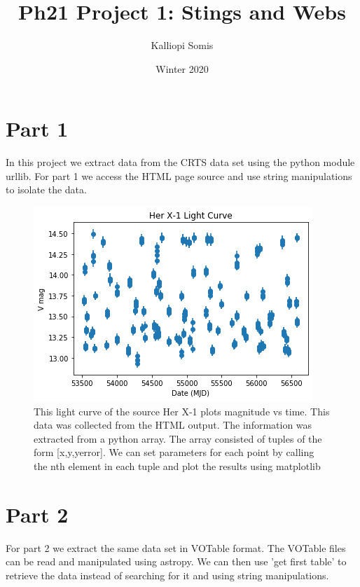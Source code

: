 \documentclass{article}
\title{Ph21 Project 1: Stings and Webs}
\author{Kalliopi Somis }
\date{Winter 2020}
\begin{document}
\maketitle

\section{Part 1}
In this project we extract data from the CRTS data set using the python module urllib. For  part 1 we access the HTML page source and use string manipulations to isolate the data. 

\begin{figure}[ht!]
\centering
\includegraphics[scale=.7]{lc1.png}
\caption{This light curve of the source Her X-1 plots magnitude vs time. This data was collected from the HTML output. The information was extracted from a python array. The array consisted of tuples of the form [x,y,yerror]. We can set parameters for each point by calling the nth element in each tuple and plot the results using matplotlib}
\label{fig: HTML Light Curve}
\end{figure}

\section{Part 2}
For part 2 we extract the same data set in VOTable format. The VOTable files can be read and manipulated using astropy. We can then use 'get first table' to retrieve the data instead of searching for it and using string manipulations. 
\end{document}
